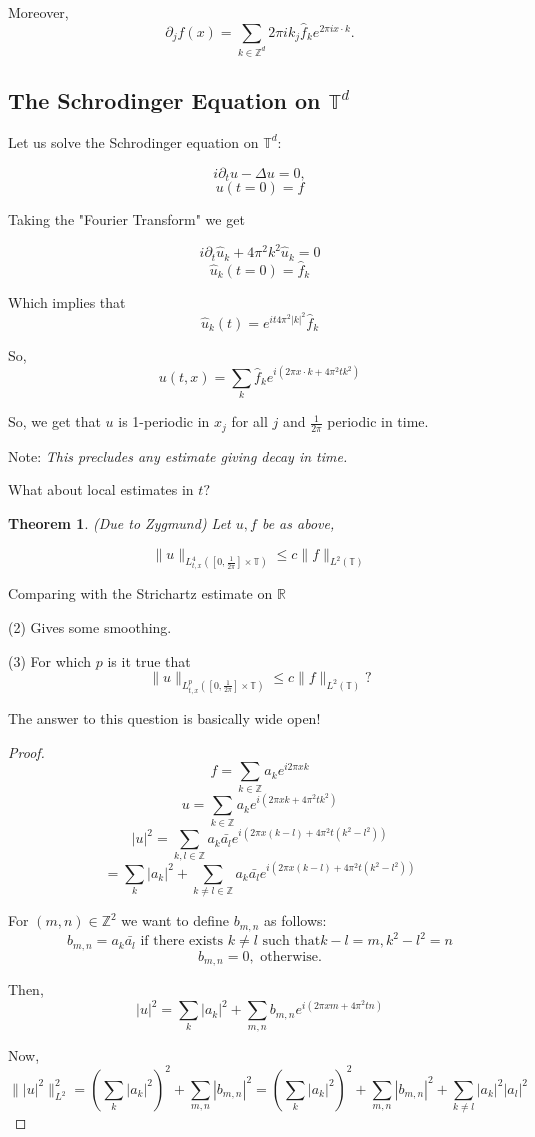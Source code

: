 \documentclass[11pt]{amsart}
\theoremstyle{plain}
\numberwithin{equation}{section}
\newtheorem{thm}{Theorem}[section]
\theoremstyle{remark}
\begin{document}
Moreover, $$\partial_{j}f(x)=\sum_{k\in \mathbb{Z}^d} 2\pi i k_{j}\hat{f}_k e^{2\pi i x\cdot k}.$$

\subsection{The Schrodinger Equation on $\mathbb{T}^d$}

Let us solve the Schrodinger equation on $\mathbb{T}^d:$

$$i\partial_{t} u -\Delta u =0,$$
$$u(t=0)=f$$

Taking the "Fourier Transform" we get 

$$i\partial_{t} \hat{u}_k + 4\pi^2 k^2 \hat{u}_k =0$$
$$\hat{u}_k (t=0)=\hat{f}_k$$

Which implies that $$\hat{u}_k (t)= e^{it4\pi^2 |k|^2} \hat{f}_k$$

So, $$u(t,x)= \sum_{k} \hat{f}_k e^{i(2\pi x\cdot k +4\pi^2 t k^2)}$$


So, we get that $u$ is 1-periodic in $x_j$ for all $j$ and $\frac{1}{2\pi}$ periodic in time. 

Note: \emph{This precludes any estimate giving decay in time.} 

What about local estimates in $t?$

\begin{thm} (Due to Zygmund) 
Let $u,f$ be as above, 

$$\| u\|_{L^{4}_{t,x}([0,\frac{1}{2\pi}]\times\mathbb{T})} \leq c \| f\|_{L^2(\mathbb{T})} $$

\end{thm}

Comparing with the Strichartz estimate on $\mathbb{R}$ 

(2) Gives some smoothing. 

(3) For which $p$ is it true that $$\| u\|_{L^{p}_{t,x}([0,\frac{1}{2\pi}]\times\mathbb{T})} \leq c \| f\|_{L^2(\mathbb{T})}? $$

The answer to this question is basically wide open!

\begin{proof}
$$f=\sum_{k\in \mathbb{Z}} a_k e^{i2\pi xk}$$
$$u=\sum_{k\in \mathbb{Z}} a_k e^{i(2\pi xk+4\pi^2 t k^2)}$$
$$|u|^2= \sum_{k,l \in \mathbb{Z}}a_{k}\bar{a_l}e^{i(2\pi x(k-l)+4\pi^2 t (k^2-l^2))}$$
$$= \sum_{k} |a_k|^2 +  \sum_{k\not = l \in \mathbb{Z}}a_{k}\bar{a_l}e^{i(2\pi x(k-l)+4\pi^2 t (k^2-l^2))}$$

For $(m,n) \in \mathbb{Z}^2$ we want to define $b_{m,n}$ as follows: $$b_{m,n}= a_{k}\bar{a_l} \, \, \text{if there exists} \, \,  k \not = l \,\, \text{such that} k-l =m , k^2-l^2=n $$
$$b_{m,n} =0, \,\, \text{otherwise}.$$

Then, $$|u|^2=\sum_{k} |a_k|^2 +  \sum_{m,n}b_{m,n}e^{i(2\pi xm+4\pi^2 t n)} $$


Now, $$\| |u|^2\|_{L^2}^2= (\sum_{k} |a_k|^2)^2 + \sum_{m,n} |b_{m,n}|^2= (\sum_{k} |a_k|^2)^2 + \sum_{m,n} |b_{m,n}|^2 + \sum_{k\not =l}|a_{k}|^2|a_{l}|^2 $$
\end{proof}
\end{document}
